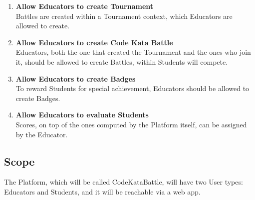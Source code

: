 \begin{enumerate}[label=$\bullet$ \textbf{GE\arabic*:}]
    \item \textbf{Allow Educators to create Tournament}\\Battles are created within a Tournament context, which Educators are allowed to create.
    \item \textbf{Allow Educators to create Code Kata Battle}\\Educators, both the one that created the Tournament and the ones who join it, should be allowed to create Battles, within Students will compete.
    \item \textbf{Allow Educators to create Badges}\\To reward Students for special achievement, Educators should be allowed to create Badges.
    \item \textbf{Allow Educators to evaluate Students}\\Scores, on top of the ones computed by the Platform itself, can be assigned by the Educator.
\end{enumerate}

\subsection{Scope}
The Platform, which will be called CodeKataBattle, will have two User types: Educators and Students, and it will be reachable via a web app.

